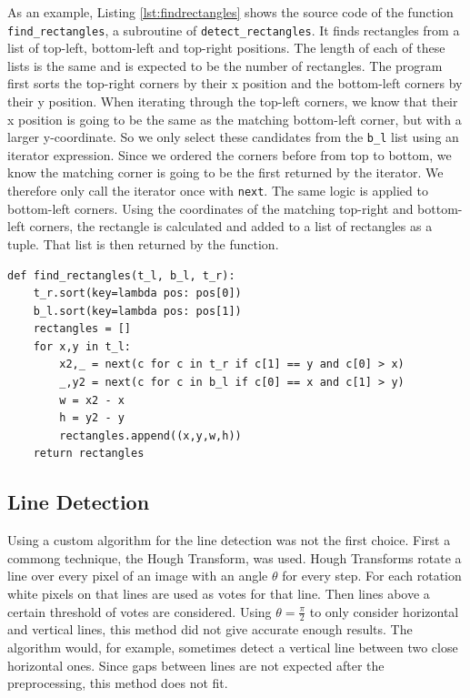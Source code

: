 \documentclass[serif,article,noparskip]{agse-thesis}
\begin{document}
As an example, Listing \ref{lst:findrectangles} shows the source code of the
function \texttt{find\_rectangles}, a subroutine of \texttt{detect\_rectangles}.
It finds rectangles from a list of top-left, bottom-left and top-right
positions. The length of each of these lists is the same and is expected to be
the number of rectangles. The program first sorts the top-right corners by their
x position and the bottom-left corners by their y position. When iterating
through the top-left corners, we know that their x position is going to be the
same as the matching bottom-left corner, but with a larger y-coordinate. So we
only select these candidates from the \texttt{b\_l} list using an iterator
expression. Since we ordered the corners before from top to bottom, we know the
matching corner is going to be the first returned by the iterator. We therefore
only call the iterator once with \texttt{next}. The same logic is applied to
bottom-left corners. Using the coordinates of the matching top-right and
bottom-left corners, the rectangle is calculated and added to a list of
rectangles as a tuple. That list is then returned by the function.

\begin{minipage}{\linewidth}
\begin{lstlisting}[otherkeywords=def,label=lst:findrectangles,caption=Function for constructing rectangles from corners]
def find_rectangles(t_l, b_l, t_r):
    t_r.sort(key=lambda pos: pos[0])
    b_l.sort(key=lambda pos: pos[1])
    rectangles = []
    for x,y in t_l:
        x2,_ = next(c for c in t_r if c[1] == y and c[0] > x)
        _,y2 = next(c for c in b_l if c[0] == x and c[1] > y)
        w = x2 - x
        h = y2 - y
        rectangles.append((x,y,w,h))
    return rectangles
\end{lstlisting}
\end{minipage}

\subsection{Line Detection} \label{linedetection}

Using a custom algorithm for the line detection was not the first choice. First
a commong technique, the Hough Transform, was used. Hough Transforms rotate a
line over every pixel of an image with an angle $\theta$ for every step. For
each rotation white pixels on that lines are used as votes for that line. Then
lines above a certain threshold of votes are considered. Using $\theta =
\frac{\pi}{2}$ to only consider horizontal and vertical lines, this method did
not give accurate enough results. The algorithm would, for example, sometimes
detect a vertical line between two close horizontal ones. Since gaps between
lines are not expected after the preprocessing, this method does not fit.
\end{document}
